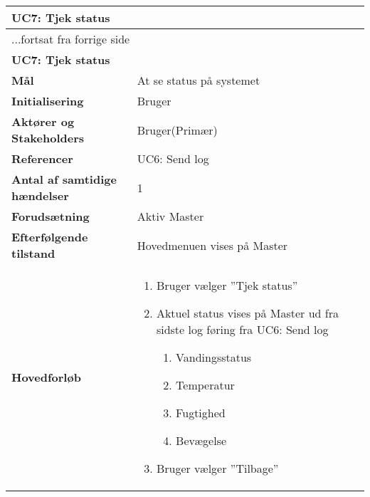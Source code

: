 \begin{center} \centering \label{UC7}
	\begin{longtable}{|p{5cm}|p{9cm}|}  %
	\hline
		\multicolumn{2}{|l|}{\textbf{UC7: Tjek status}} \\\hline %
		\endfirsthead
		
		\multicolumn{2}{l}{...fortsat fra forrige side} \\ \hline %
		\multicolumn{2}{|l|}{\textbf{UC7: Tjek status}} \\\hline %
		\endhead	
		
		\textbf{Mål}								&At se status på systemet			\\\hline
		\textbf{Initialisering}					&Bruger							\\\hline
		\textbf{Aktører og Stakeholders}			&Bruger(Primær)					\\\hline
		\textbf{Referencer}						&UC6: Send log					\\\hline
		\textbf{Antal af samtidige hændelser}	&1								\\\hline
		\textbf{Forudsætning}					&Aktiv Master				\\\hline
		\textbf{Efterfølgende tilstand}			&Hovedmenuen vises på Master			\\\hline
		\textbf{Hovedforløb}					
			&\begin{enumerate}
	
				\item Bruger vælger ''Tjek status''
				
				\item Aktuel status vises på Master ud fra sidste log føring fra UC6: Send log
				
				\begin{enumerate}
					\item Vandingsstatus
					\item Temperatur
					\item Fugtighed
					\item Bevægelse
				\end{enumerate}
				
				\item Bruger vælger ''Tilbage''
	
			\end{enumerate}\\\hline
	\end{longtable} 
\end{center}

